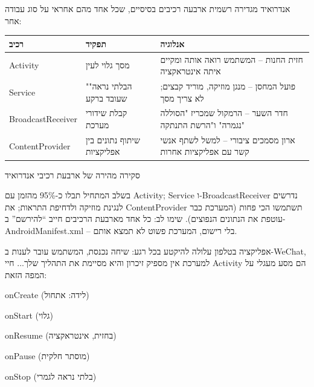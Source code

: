 


אנדרואיד מגדירה רשמית ארבעה רכיבים בסיסיים, שכל אחד מהם אחראי על סוג עבודה אחר:

\begin{center}
\begin{tabularx}{\linewidth}{|X|X|X|}
\hline
\textbf{רכיב} & \textbf{תפקיד} & \textbf{אנלוגיה} \tabularnewline
\hline
Activity & מסך גלוי לעין & חזית החנות – המשתמש רואה אותה ומקיים איתה אינטראקציה \tabularnewline
Service & "הבלתי נראה" שעובד ברקע & פועל המחסן – מנגן מוזיקה, מוריד קבצים; לא צריך מסך \tabularnewline
BroadcastReceiver & קבלת שידורי מערכת & חדר השער – הרמקול שמכריז "הסוללה נגמרה" ו"הרשת התנתקה" \tabularnewline
ContentProvider & שיתוף נתונים בין אפליקציות & ארון מסמכים ציבורי – למשל לשתף אנשי קשר עם אפליקציות אחרות \tabularnewline
\hline
\end{tabularx}
\end{center}

\begin{center}\small\color{gray}סקירה מהירה של ארבעת רכיבי אנדרואיד\end{center}

בשלב המתחיל תבלו כ-95\% מהזמן עם Activity; ‏Service ו-BroadcastReceiver נדרשים לנגינת מוזיקה ולדחיפת התראות; את ContentProvider תשתמשו הכי פחות (המערכת כבר עוטפת את הנתונים הנפוצים). שימו לב: כל אחד מארבעת הרכיבים חייב “להירשם” ב-AndroidManifest.xml – בלי רישום, המערכת פשוט לא תמצא אותם.


אפליקציה בטלפון עלולה להיקטע בכל רגע: שיחה נכנסת, המשתמש עובר לענות ב-WeChat, למערכת אין מספיק זיכרון והיא מסיימת את התהליך שלך... חיי Activity הם מסע מעגלי על המפה הזאת:

onCreate (לידה: אתחול)

onStart (גלוי)

onResume (בחזית, אינטראקציה)

onPause (מוסתר חלקית)

onStop (בלתי נראה לגמרי)

